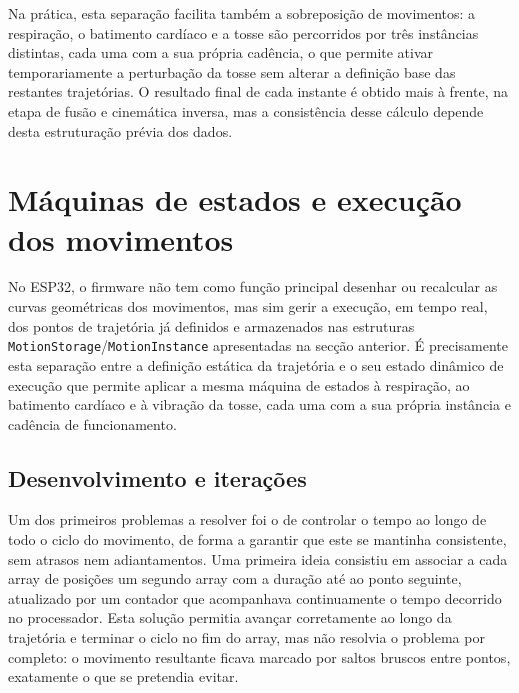 Na prática, esta separação facilita também a sobreposição de movimentos: a respiração, o batimento cardíaco e a tosse são percorridos por três instâncias distintas, cada uma com a sua própria cadência, o que permite ativar temporariamente a perturbação da tosse sem alterar a definição base das restantes trajetórias. O resultado final de cada instante é obtido mais à frente, na etapa de fusão e cinemática inversa, mas a consistência desse cálculo depende desta estruturação prévia dos dados.

\section{Máquinas de estados e execução dos movimentos}
No ESP32, o firmware não tem como função principal desenhar ou recalcular as curvas geométricas dos movimentos, mas sim gerir a execução, em tempo real, dos pontos de trajetória já definidos e armazenados nas estruturas \texttt{MotionStorage}/\texttt{MotionInstance} apresentadas na secção anterior. É precisamente esta separação entre a definição estática da trajetória e o seu estado dinâmico de execução que permite aplicar a mesma máquina de estados à respiração, ao batimento cardíaco e à vibração da tosse, cada uma com a sua própria instância e cadência de funcionamento.

\subsection{Desenvolvimento e iterações}\label{subsec:desenvolvimento-execucao}
Um dos primeiros problemas a resolver foi o de controlar o tempo ao longo de todo o ciclo do movimento, de forma a garantir que este se mantinha consistente, sem atrasos nem adiantamentos. Uma primeira ideia consistiu em associar a cada array de posições um segundo array com a duração até ao ponto seguinte, atualizado por um contador que acompanhava continuamente o tempo decorrido no processador. Esta solução permitia avançar corretamente ao longo da trajetória e terminar o ciclo no fim do array, mas não resolvia o problema por completo: o movimento resultante ficava marcado por saltos bruscos entre pontos, exatamente o que se pretendia evitar.

